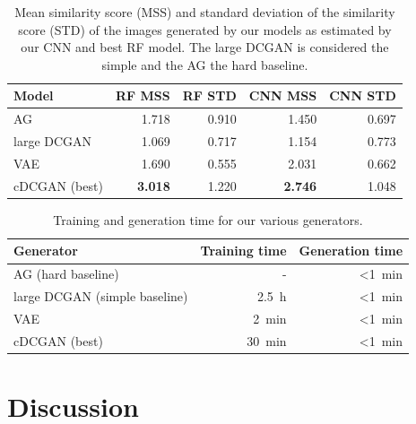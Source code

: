 \documentclass[10pt,conference,compsocconf]{IEEEtran}
\begin{document}
\begin{table}\centering
    \begin{tabular}{lrr|rr}
    \toprule
        Model           & RF MSS                & RF STD        & CNN MSS               & CNN STD \\
    \midrule
        AG   & \SI{1.718}{}          & \SI{0.910}{}  & \SI{1.450}{}          & \SI{0.697}{} \\
        large DCGAN    & \SI{1.069}{}          & \SI{0.717}{}  & \SI{1.154}{}          & \SI{0.773}{} \\
        VAE             & \SI{1.690}{}          & \SI{0.555}{}  & \SI{2.031}{}          & \SI{0.662}{} \\
        cDCGAN (best)       & \textbf{\SI{3.018}{}} & \SI{1.220}{}  & \textbf{\SI{2.746}{}} & \SI{1.048}{} \\
    \bottomrule
    \end{tabular}
    \caption{Mean similarity score (MSS) and standard deviation of the similarity score (STD) of the images generated by our models as estimated by our CNN and best RF model. The large DCGAN is considered the simple and the AG the hard baseline.}
\label{tab:gen_MSS}
\end{table}

\begin{table}\centering
    \begin{tabular}{lrr}
    \toprule
        Generator   & Training time     & Generation time \\
    \midrule
        AG (hard baseline)   & -                 & \SI{<1}{\minute} \\
        large DCGAN (simple baseline) & \SI{2.5}{\hour}   & \SI{<1}{\minute} \\
        VAE         & \SI{2}{\minute}   & \SI{<1}{\minute} \\
        cDCGAN (best)     & \SI{30}{\minute}  & \SI{<1}{\minute} \\
    \bottomrule
    \end{tabular}
\caption{Training and generation time for our various generators.}
\label{tab:gen_time}
\end{table}

\section{Discussion}
\end{document}
